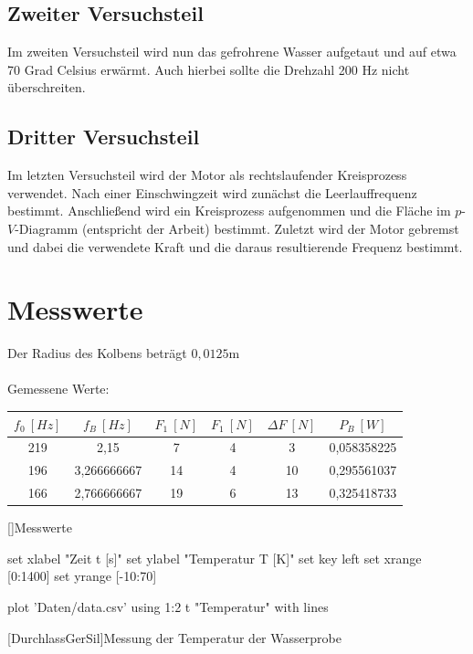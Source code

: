 \documentclass[12pt,a4paper]{scrartcl}
\begin{document}
\subsection{Zweiter Versuchsteil}
Im zweiten Versuchsteil wird nun das gefrohrene Wasser aufgetaut und auf etwa 70 Grad Celsius erwärmt. Auch hierbei sollte die Drehzahl 200 Hz nicht überschreiten.
\subsection{Dritter Versuchsteil}
Im letzten Versuchsteil wird der Motor als rechtslaufender Kreisprozess verwendet. Nach einer Einschwingzeit wird zunächst die Leerlauffrequenz bestimmt. Anschließend wird ein Kreisprozess aufgenommen und die Fläche im $p$-$V$-Diagramm (entspricht der Arbeit) bestimmt. Zuletzt wird der Motor gebremst und dabei die verwendete Kraft und die daraus resultierende Frequenz bestimmt.
    
\pagebreak
\section{Messwerte}
Der Radius des Kolbens beträgt $0,0125\si{\metre}$\\
\\
Gemessene Werte: \\
\begin{center}
\begin{tabular}{c|c|c|c|c|c}
$f_0~[Hz]$ & $f_B~[Hz]$ & $F_1~[N]$ & $F_1~[N]$ & $\Delta F ~[N]$ & $P_B~[W]$\\ \hline \hline
219 & 2,15 & 7 & 4 & 3 & 0,058358225\\
196 & 3,266666667 & 14 & 4 & 10 & 0,295561037\\
166 & 2,766666667 & 19 & 6 & 13 & 0,325418733\\

\end{tabular}
[]{Messwerte}
\end{center}
\begin{center}

\begin{gnuplot}[terminal=pdf,terminaloptions={font ",10" linewidth 1},scale=1.2]
		set xlabel "Zeit t [s]"
		set ylabel "Temperatur T [K]"
        set key left
   	 	set xrange [0:1400]
        set yrange [-10:70]
        
		plot 'Daten/data.csv' using 1:2 t "Temperatur" with lines
	\end{gnuplot}
    [DurchlassGerSil]{Messung der Temperatur der Wasserprobe} 
\end{center}
\end{document}
